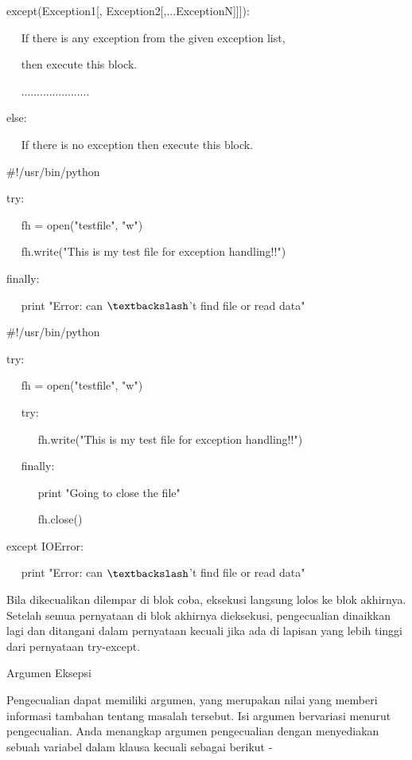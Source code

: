 except(Exception1[, Exception2[,...ExceptionN]]]): \par
~~ If there is any exception from the given exception list,  \par
~~ then execute this block. \par
~~ ...................... \par
else: \par
~~ If there is no exception then execute this block.  \par
\vspace{12pt}
\vspace{12pt}
 $  \#  $!/usr/bin/python \par
\vspace{12pt}
try: \par
~~ fh = open("testfile", "w") \par
~~ fh.write("This is my test file for exception handling!!") \par
finally: \par
~~ print "Error: can $  \textbackslash  $'t find file or read data" \par
\vspace{12pt}
\vspace{12pt}
 $  \#  $!/usr/bin/python \par
\vspace{12pt}
try: \par
~~ fh = open("testfile", "w") \par
~~ try: \par
~~~~~ fh.write("This is my test file for exception handling!!") \par
~~ finally: \par
~~~~~ print "Going to close the file" \par
~~~~~ fh.close() \par
except IOError: \par
~~ print "Error: can $  \textbackslash  $'t find file or read data" \par
\vspace{12pt}
\vspace{12pt}
Bila dikecualikan dilempar di blok coba, eksekusi langsung lolos ke blok akhirnya. Setelah semua pernyataan di blok akhirnya dieksekusi, pengecualian dinaikkan lagi dan ditangani dalam pernyataan kecuali jika ada di lapisan yang lebih tinggi dari pernyataan try-except. \par
Argumen Eksepsi \par
\vspace{12pt}
Pengecualian dapat memiliki argumen, yang merupakan nilai yang memberi informasi tambahan tentang masalah tersebut. Isi argumen bervariasi menurut pengecualian. Anda menangkap argumen pengecualian dengan menyediakan sebuah variabel dalam klausa kecuali sebagai berikut - \par

